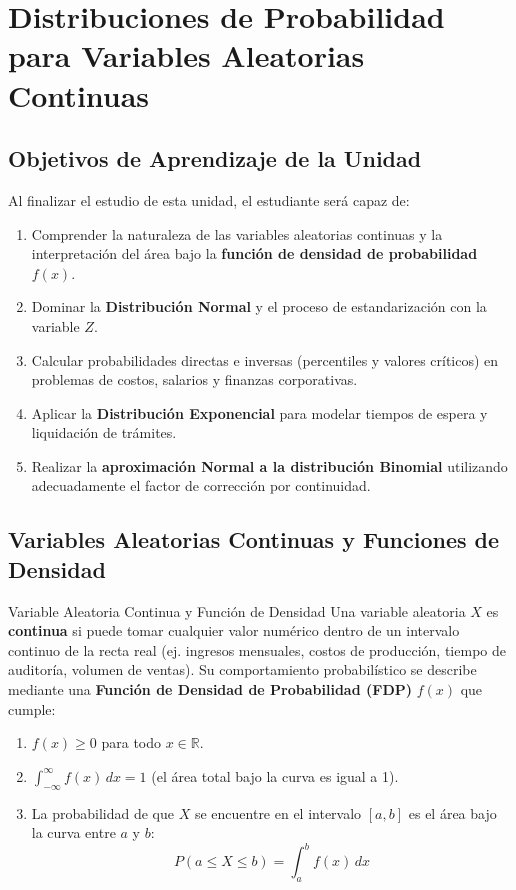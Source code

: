 \chapter{Distribuciones de Probabilidad para Variables Aleatorias Continuas}
\label{cap:distribuciones_continuas}

\section*{Objetivos de Aprendizaje de la Unidad}
Al finalizar el estudio de esta unidad, el estudiante será capaz de:
\begin{enumerate}
    \item Comprender la naturaleza de las variables aleatorias continuas y la interpretación del área bajo la \textbf{función de densidad de probabilidad} $f(x)$.
    \item Dominar la \textbf{Distribución Normal} y el proceso de estandarización con la variable $Z$.
    \item Calcular probabilidades directas e inversas (percentiles y valores críticos) en problemas de costos, salarios y finanzas corporativas.
    \item Aplicar la \textbf{Distribución Exponencial} para modelar tiempos de espera y liquidación de trámites.
    \item Realizar la \textbf{aproximación Normal a la distribución Binomial} utilizando adecuadamente el factor de corrección por continuidad.
\end{enumerate}

\section{Variables Aleatorias Continuas y Funciones de Densidad}

\begin{definicion}{Variable Aleatoria Continua y Función de Densidad}
Una variable aleatoria $X$ es \textbf{continua} si puede tomar cualquier valor numérico dentro de un intervalo continuo de la recta real (ej. ingresos mensuales, costos de producción, tiempo de auditoría, volumen de ventas). Su comportamiento probabilístico se describe mediante una \textbf{Función de Densidad de Probabilidad (FDP)} $f(x)$ que cumple:
\begin{enumerate}
    \item $f(x) \ge 0$ para todo $x \in \mathbb{R}$.
    \item $\int_{-\infty}^{\infty} f(x) \, dx = 1$ (el área total bajo la curva es igual a 1).
    \item La probabilidad de que $X$ se encuentre en el intervalo $[a, b]$ es el área bajo la curva entre $a$ y $b$:
    \begin{equation}
        P(a \le X \le b) = \int_a^b f(x) \, dx
    \end{equation}
\end{enumerate}
\end{definicion}

